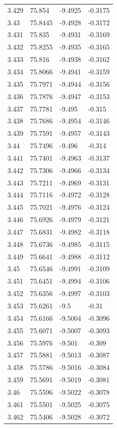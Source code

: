 \begin{tabular}{llll}
3.429 & 75.854 & -9.4925 & -0.3175 \\
3.43 & 75.8445 & -9.4928 & -0.3172 \\
3.431 & 75.835 & -9.4931 & -0.3169 \\
3.432 & 75.8255 & -9.4935 & -0.3165 \\
3.433 & 75.816 & -9.4938 & -0.3162 \\
3.434 & 75.8066 & -9.4941 & -0.3159 \\
3.435 & 75.7971 & -9.4944 & -0.3156 \\
3.436 & 75.7876 & -9.4947 & -0.3153 \\
3.437 & 75.7781 & -9.495 & -0.315 \\
3.438 & 75.7686 & -9.4954 & -0.3146 \\
3.439 & 75.7591 & -9.4957 & -0.3143 \\
3.44 & 75.7496 & -9.496 & -0.314 \\
3.441 & 75.7401 & -9.4963 & -0.3137 \\
3.442 & 75.7306 & -9.4966 & -0.3134 \\
3.443 & 75.7211 & -9.4969 & -0.3131 \\
3.444 & 75.7116 & -9.4972 & -0.3128 \\
3.445 & 75.7021 & -9.4976 & -0.3124 \\
3.446 & 75.6926 & -9.4979 & -0.3121 \\
3.447 & 75.6831 & -9.4982 & -0.3118 \\
3.448 & 75.6736 & -9.4985 & -0.3115 \\
3.449 & 75.6641 & -9.4988 & -0.3112 \\
3.45 & 75.6546 & -9.4991 & -0.3109 \\
3.451 & 75.6451 & -9.4994 & -0.3106 \\
3.452 & 75.6356 & -9.4997 & -0.3103 \\
3.453 & 75.6261 & -9.5 & -0.31 \\
3.454 & 75.6166 & -9.5004 & -0.3096 \\
3.455 & 75.6071 & -9.5007 & -0.3093 \\
3.456 & 75.5976 & -9.501 & -0.309 \\
3.457 & 75.5881 & -9.5013 & -0.3087 \\
3.458 & 75.5786 & -9.5016 & -0.3084 \\
3.459 & 75.5691 & -9.5019 & -0.3081 \\
3.46 & 75.5596 & -9.5022 & -0.3078 \\
3.461 & 75.5501 & -9.5025 & -0.3075 \\
3.462 & 75.5406 & -9.5028 & -0.3072 \\

\end{tabular}
